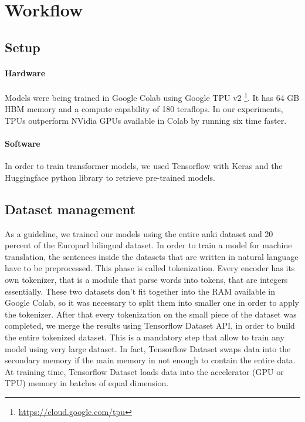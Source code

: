 \section{Workflow}
\subsection{Setup}
\paragraph{Hardware}
Models were being trained in Google Colab using Google TPU v2 \footnote{\url{https://cloud.google.com/tpu}}. It has 64 GB HBM memory and a compute capability of 180 teraflops. In our experiments, TPUs outperform NVidia GPUs available in Colab by running six time faster.
\paragraph{Software}
In order to train transformer models, we used Tensorflow with Keras \cite{keras_io} and the Huggingface \cite{huggingface_co} python library to retrieve pre-trained models.

\subsection{Dataset management}
As a guideline, we trained our models using the entire anki dataset and 20 percent of the Europarl bilingual dataset. In order to train a model for machine translation, the sentences inside the datasets that are written in natural language have to be preprocessed. This phase is called tokenization. Every encoder has its own tokenizer, that is a module that parse words into tokens, that are integers essentially. These two datasets don't fit together into the RAM available in Google Colab, so it was necessary to split them into smaller one in order to apply the tokenizer. After that every tokenization on the small piece of the dataset was completed, we merge the results using Tensorflow Dataset API, in order to build the entire tokenized dataset. This is a mandatory step that allow to train any model using very large dataset. In fact, Tensorflow Dataset swaps data into the secondary memory if the main memory in not enough to contain the entire data. At training time, Tensorflow Dataset loads data into the accelerator (GPU or TPU) memory in batches of equal dimension. 

